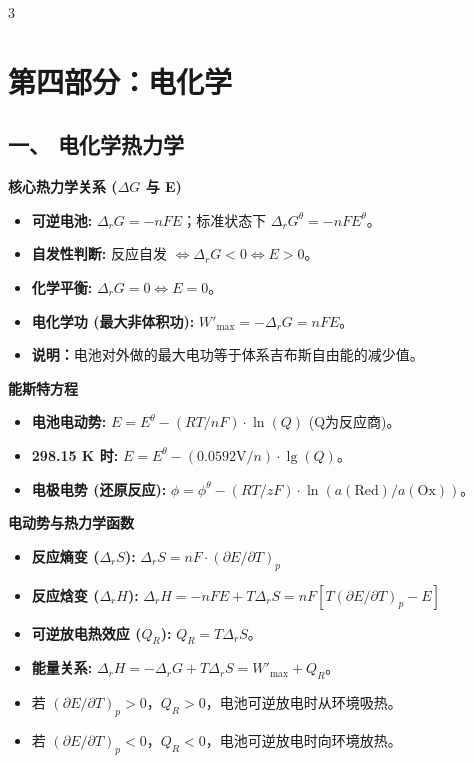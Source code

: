 \documentclass[a4paper,6pt]{article} %
\begin{document}
\begin{multicols}{3}
\section*{第四部分：电化学}
\subsection*{一、 电化学热力学}
\textbf{核心热力学关系 ($\Delta G$ 与 E)}
\begin{itemize}
    \item \textbf{可逆电池:} $\Delta_r G = -nFE$；标准状态下 $\Delta_r G^\theta = -nFE^\theta$。
    \item \textbf{自发性判断:} 反应自发 $\Leftrightarrow \Delta_r G < 0 \Leftrightarrow E > 0$。
    \item \textbf{化学平衡:} $\Delta_r G = 0 \Leftrightarrow E = 0$。
    \item \textbf{电化学功 (最大非体积功):} $W'_{\text{max}} = -\Delta_r G = nFE$。
    \item \textbf{说明：}电池对外做的最大电功等于体系吉布斯自由能的减少值。
\end{itemize}

\textbf{能斯特方程}
\begin{itemize}
    \item \textbf{电池电动势:} $E = E^\theta - (RT/nF) \cdot \ln(Q)$ (Q为反应商)。
    \item \textbf{298.15 K 时:} $E = E^\theta - (0.0592\text{V} / n) \cdot \lg(Q)$。
    \item \textbf{电极电势 (还原反应):} $\phi = \phi^\theta - (RT/zF) \cdot \ln( a(\text{Red}) / a(\text{Ox}) )$。
\end{itemize}

\textbf{电动势与热力学函数}
\begin{itemize}
    \item \textbf{反应熵变 ($\Delta_r S$):} $\Delta_r S = nF \cdot (\partial E/\partial T)_p$
    \item \textbf{反应焓变 ($\Delta_r H$):} $\Delta_r H = -nFE + T\Delta_r S = nF[T(\partial E/\partial T)_p - E]$
    \item \textbf{可逆放电热效应 ($Q_R$):} $Q_R = T\Delta_r S$。
    \item \textbf{能量关系:} $\Delta_r H = -\Delta_r G + T\Delta_r S = W'_{\text{max}} + Q_R$。
    \item 若 $(\partial E/\partial T)_p > 0$，$Q_R > 0$，电池可逆放电时从环境吸热。
    \item 若 $(\partial E/\partial T)_p < 0$，$Q_R < 0$，电池可逆放电时向环境放热。
\end{itemize}


\end{multicols}
\end{document}
